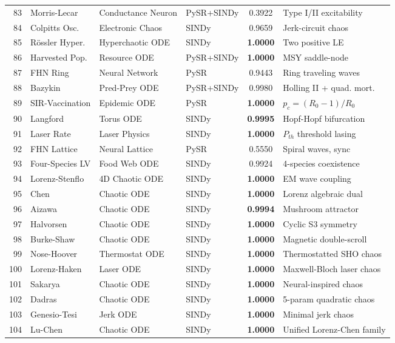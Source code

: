 \begin{table}[t]
\begin{tabular}{rlllcl}
83 & Morris-Lecar & Conductance Neuron & PySR+SINDy & 0.3922 & Type I/II excitability \\
84 & Colpitts Osc. & Electronic Chaos & SINDy & 0.9659 & Jerk-circuit chaos \\
85 & R\"ossler Hyper. & Hyperchaotic ODE & SINDy & \textbf{1.0000} & Two positive LE \\
86 & Harvested Pop. & Resource ODE & PySR+SINDy & \textbf{1.0000} & MSY saddle-node \\
87 & FHN Ring & Neural Network & PySR & 0.9443 & Ring traveling waves \\
88 & Bazykin & Pred-Prey ODE & PySR+SINDy & 0.9980 & Holling II + quad. mort. \\
89 & SIR-Vaccination & Epidemic ODE & PySR & \textbf{1.0000} & $p_c = (R_0{-}1)/R_0$ \\
90 & Langford & Torus ODE & SINDy & \textbf{0.9995} & Hopf-Hopf bifurcation \\
91 & Laser Rate & Laser Physics & SINDy & \textbf{1.0000} & $P_{th}$ threshold lasing \\
92 & FHN Lattice & Neural Lattice & PySR & 0.5550 & Spiral waves, sync \\
93 & Four-Species LV & Food Web ODE & SINDy & 0.9924 & 4-species coexistence \\
94 & Lorenz-Stenflo & 4D Chaotic ODE & SINDy & \textbf{1.0000} & EM wave coupling \\
95 & Chen & Chaotic ODE & SINDy & \textbf{1.0000} & Lorenz algebraic dual \\
96 & Aizawa & Chaotic ODE & SINDy & \textbf{0.9994} & Mushroom attractor \\
97 & Halvorsen & Chaotic ODE & SINDy & \textbf{1.0000} & Cyclic S3 symmetry \\
98 & Burke-Shaw & Chaotic ODE & SINDy & \textbf{1.0000} & Magnetic double-scroll \\
99 & Nose-Hoover & Thermostat ODE & SINDy & \textbf{1.0000} & Thermostatted SHO chaos \\
100 & Lorenz-Haken & Laser ODE & SINDy & \textbf{1.0000} & Maxwell-Bloch laser chaos \\
101 & Sakarya & Chaotic ODE & SINDy & \textbf{1.0000} & Neural-inspired chaos \\
102 & Dadras & Chaotic ODE & SINDy & \textbf{1.0000} & 5-param quadratic chaos \\
103 & Genesio-Tesi & Jerk ODE & SINDy & \textbf{1.0000} & Minimal jerk chaos \\
104 & Lu-Chen & Chaotic ODE & SINDy & \textbf{1.0000} & Unified Lorenz-Chen family \\

\end{tabular}
\end{table}
